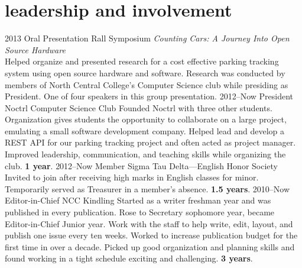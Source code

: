 \documentclass[]{friggeri-cv} %
\begin{document}

\section{leadership and involvement}

\begin{entrylist}
\entry
{2013}
{Oral Presentation}
{Rall Symposium}
{\emph{Counting Cars: A Journey Into Open Source Hardware}\\
Helped organize and presented research for a cost effective parking tracking system using open source hardware and software.
Research was conducted by members of North Central College's Computer Science club while presiding as President.
One of four speakers in this group presentation.}
\entry
{2012--Now}
{President}
{Noctrl Computer Science Club}
{Founded Noctrl with three other students.
Organization gives students the opportunity to collaborate on a large project, emulating a small software development company.
Helped lead and develop a REST API for our parking tracking project and often acted as project manager.
Improved leadership, communication, and teaching skills while organizing the club. \textbf{1 year}.}
\entry
{2012--Now}
{Member}
{Sigma Tau Delta---English Honor Society}
{Invited to join after receiving high marks in English classes for minor.
Temporarily served as Treasurer in a member's absence. \textbf{1.5 years}.}
\entry
{2010--Now}
{Editor-in-Chief}
{NCC Kindling}
{Started as a writer freshman year and was published in every publication.
Rose to Secretary sophomore year, became Editor-in-Chief Junior year.
Work with the staff to help write, edit, layout, and publish one issue every ten weeks.
Worked to increase publication budget for the first time in over a decade.
Picked up good organization and planning skills and found working in a tight schedule exciting and challenging. \textbf{3 years}.}
\end{entrylist}
\end{document}
